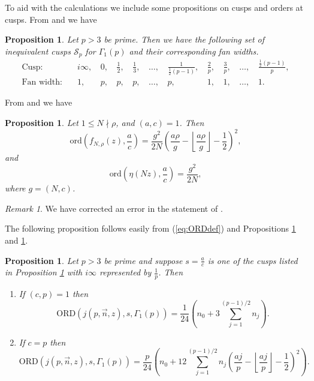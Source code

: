 \documentclass[12pt]{amsart}
\newtheorem{prop}[theorem]{Proposition}
\theoremstyle{definition}
\theoremstyle{remark}
\newtheorem*{remark}{Remark}
\numberwithin{equation}{section}
\newcommand\Lpar[1]{\left(#1\right)}
\newcommand\FL[1]{\left\lfloor#1\right\rfloor}
\newcommand\ord{\mbox{ord}}
\newcommand\ORD{\mbox{ORD}}
\newcommand\propo[1]{\ref{propo:#1}}
\newcommand\eqn[1]{(\ref{eq:#1})}
\begin{document}
To aid with the calculations we include some propositions on cusps and 
orders at cusps.
From \cite[Corollary 4, p.930]{Ch-Ko-Pa} and \cite[Lemma 3, p.929]{Ch-Ko-Pa}
we have
\begin{prop}
\label{propo:cusps1}
Let $p>3$ be prime. Then we have the following set of inequivalent cusps $\mathcal{S}_p$ 
for $\Gamma_1(p)$ and their corresponding fan widths.
$$
\begin{matrix}
\mbox{Cusp:}\quad  & i\infty,\, & 0,\,  & \frac{1}{2},\, & \frac{1}{3},\, & \dots,\, & \frac{1}{\tfrac{1}{2}(p-1)},\, & \frac{2}{p},\, & \frac{3}{p},\, & \dots,\, & \frac{\tfrac{1}{2}(p-1)}{p},\\
\mbox{Fan width:}\quad & 1,\, &  p,\, & p,\, & p,\, & \dots,\, & p,\, & 1,\, & 1,\, & \dots,\, & 1.     
\end{matrix}
$$
\end{prop}
From \cite[Prop.2.1, p.34]{Ko-book} and \cite[Lemma 3.2, p.285]{Bi89} we have
\begin{prop}
\label{propo:ford}
Let $1\le N\nmid \rho$, and $(a,c)=1$. Then
$$
\ord\Lpar{f_{N,\rho}(z),\frac{a}{c}} = 
\frac{g^2}{2N}\Lpar{\frac{a\rho}{g} - \FL{\frac{a\rho}{g}} - \frac{1}{2}}^2,
$$
and
$$
\ord\Lpar{\eta(N z),\frac{a}{c}} = 
\frac{g^2}{2N},
$$
where $g=(N,c)$.
\end{prop}
\begin{remark}
We have corrected an error in the statement of \cite[Prop.6.13]{Ga19a}.
\end{remark}
The following proposition follows easily from \eqn{ORDdef} and 
Propositions \propo{cusps1} and \propo{ford}.
\begin{prop}
\label{propo:ncuspORDS}
Let $p>3$ be prime and suppose $s=\frac{a}{c}$ is one of the cusps listed
in Proposition \propo{cusps1} with $i\infty$ represented by $\frac{1}{p}$.
Then 
\begin{enumerate}
\item[(i)]
If $(c,p)=1$ then
$$
\ORD\left(j(p,\overrightarrow{n},z),s,\Gamma_1(p)\right)
= \frac{1}{24}\left( n_0 + 3 \sum_{j=1}^{(p-1)/2} n_j\right).
$$
\item[(ii)] 
If $c=p$ then
$$
\ORD\left(j(p,\overrightarrow{n},z),s,\Gamma_1(p)\right)
= \frac{p}{24}\left( n_0 + 12 \sum_{j=1}^{(p-1)/2} 
n_j \left( \frac{aj}{p} - \FL{\frac{aj}{p}} - \frac{1}{2}\right)^2\right).
$$
\end{enumerate}
\end{prop}
\end{document}
